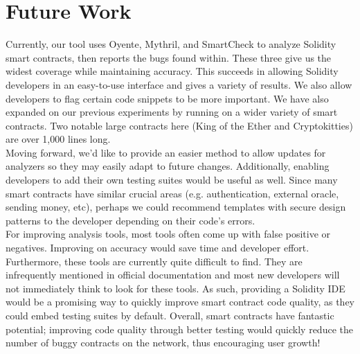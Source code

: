 \section{Future Work}

Currently, our tool uses Oyente, Mythril, and SmartCheck to analyze Solidity smart contracts, then reports the bugs found within. These three give us the widest coverage while maintaining accuracy. This succeeds in allowing Solidity developers in an easy-to-use interface and gives a variety of results. We also allow developers to flag certain code snippets to be more important. We have also expanded on our previous experiments by running on a wider variety of smart contracts. Two notable large contracts here (King of the Ether and Cryptokitties) are over 1,000 lines long. \\

Moving forward, we'd like to provide an easier method to allow updates for analyzers so they may easily adapt to future changes. Additionally, enabling developers to add their own testing suites would be useful as well. Since many smart contracts have similar crucial areas (e.g. authentication, external oracle, sending money, etc), perhaps we could recommend templates with secure design patterns to the developer depending on their code's errors. \\

For improving analysis tools, most tools often come up with false positive or negatives. Improving on accuracy would save time and developer effort. Furthermore, these tools are currently quite difficult to find. They are infrequently mentioned in official documentation and most new developers will not immediately think to look for these tools. As such, providing a Solidity IDE would be a promising way to quickly improve smart contract code quality, as they could embed testing suites by default. Overall, smart contracts have fantastic potential; improving code quality through better testing would quickly reduce the number of buggy contracts on the network, thus encouraging user growth!  

